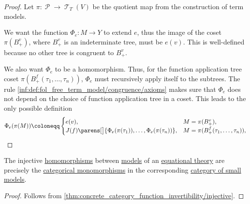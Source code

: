 \begin{proof}
  Let \( \pi: \mscrP \to \mscrT_T(V) \) be the quotient map from the construction of term models.

  We want the function \( \Phi_e: M \to Y \) to extend \( e \), thus the image of the coset \( \pi(B_+^v) \), where \( B_+^v \) is an indeterminate tree, must be \( e(v) \). This is well-defined because no other tree is congruent to \( B_+^v \).

  We also want \( \Phi_e \) to be a homomorphism. Thus, for the function application tree coset \( \pi(B_+^f(\tau_1, \ldots, \tau_n)) \), \( \Phi_e \) must recursively apply itself to the subtrees. The rule \ref{inf:def:fol_free_term_model/congruence/axioms} makes sure that \( \Phi_e \) does not depend on the choice of function application tree in a coset. This leads to the only possible definition
  \begin{equation*}
    \Phi_e(\pi(M)) \coloneqq \begin{cases}
      e(v),                                                                  &M = \pi(B_+^v), \\
      J(f)\parens[\big]{ \Phi_e(\pi(\tau_1)), \ldots, \Phi_e(\pi(\tau_n)) }, &M = \pi(B_+^f(\tau_1, \ldots, \tau_n)),
    \end{cases}
  \end{equation*}
\end{proof}

\begin{corollary}\label{thm:fol_equational_theory_injective_homomorphisms}
  The injective \hyperref[def:fol_homomorphism]{homomorphisms} between \hyperref[def:fol_semantics/model]{models} of an \hyperref[def:fol_equational_theory]{equational theory} are precisely the \hyperref[def:morphism_cancellation/left]{categorical monomorphisms} in the corresponding \hyperref[def:fol_theory_model_functor/obj]{category of small models}.
\end{corollary}
\begin{proof}
  Follows from \cref{thm:concrete_category_function_invertibility/injective}.
\end{proof}


